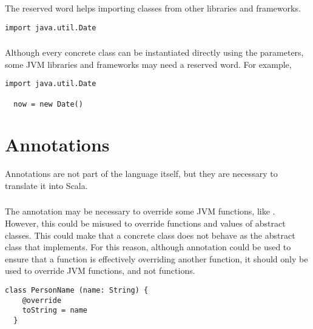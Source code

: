 \subsubsection{\simport}

The reserved word \simport helps importing classes from other libraries and frameworks.

\begin{lstlisting}[label={lst:exampleImport}]
  import java.util.Date
\end{lstlisting}

\subsubsection{\snew}

Although every concrete class can be instantiated directly using the parameters, some JVM libraries and frameworks may need a \snew reserved word.
For example,

\begin{lstlisting}[label={lst:exampleImportDate}]
  import java.util.Date

  now = new Date()
\end{lstlisting}


\section{Annotations}

Annotations are not part of the language itself, but they are necessary to translate it into Scala.

\subsubsection{\soverride}

The \soverride annotation may be necessary to override some JVM functions, like .
However, this could be misused to override functions and values of abstract classes.
This could make that a concrete class does not behave as the abstract class that implements.
For this reason, although \soverride annotation could be used to ensure that a function is effectively overriding another function, it should only be used to override JVM functions, and not \Soda functions.

\begin{lstlisting}[label={lst:exampleOverride}]
  class PersonName (name: String) {
    @override
    toString = name
  }
\end{lstlisting}


